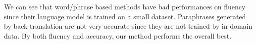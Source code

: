 We can see that word/phrase based methods have bad performances on fluency since their language model is trained on a small dataset. Paraphrases generated by back-translation are not very accurate since they are not trained by in-domain data. By both fluency and accuracy, our method performs the overall best.
